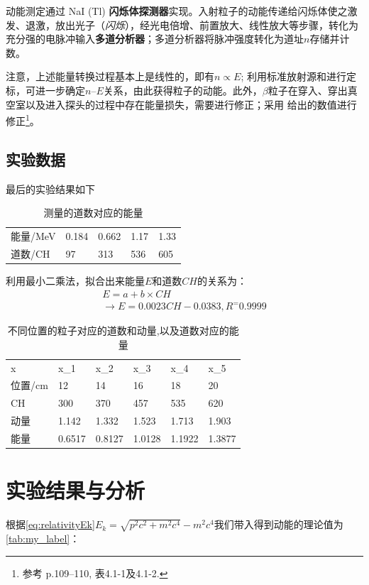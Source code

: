 \documentclass{buaaemp}
\begin{document}
	动能测定通过 NaI (Tl) \textbf{闪烁体探测器}实现。入射粒子的动能传递给闪烁体使之激发、退激，放出光子（\textit{闪烁}），经光电倍增、前置放大、线性放大等步骤，转化为充分强的电脉冲输入\textbf{多道分析器}；多道分析器将脉冲强度转化为道址$n$存储并计数。
	
	注意，上述能量转换过程基本上是线性的，即有$n\propto E$; 利用标准放射源\CsAtom 和\CoAtom 进行定标，可进一步确定$n$--$E$关系，由此获得粒子的动能。此外，$\beta$粒子在穿入、穿出真空室以及进入探头的过程中存在能量损失，需要进行修正；采用 \cite{钱建强2016近代物理实验} 给出的数值进行修正\footnote{%
		参考\cite{钱建强2016近代物理实验} p.\numrange{109}{110}, 表4.1-1及4.1-2. }。


\subsection{实验数据}
最后的实验结果如下

\begin{table}[h]
\begin{tabular}{lllll}
能量/MeV & 0.184 & 0.662 & 1.17 & 1.33 \\ 
道数/CH  & 97    & 313   & 536  & 605          
\end{tabular}
\caption{测量的道数对应的能量}
\label{tab:measure}
\end{table}

利用最小二乘法，拟合出来能量$E$和道数$CH$的关系为：
\begin{equation}
\begin{gathered}
     E=a+b\times CH \\
    \to E=0.0023CH-0.0383, R^=0.9999
\end{gathered}
\end{equation}

\begin{table}[h]
\begin{tabular}{llllll}
x & x\_1 & x\_2 & x\_3 & x\_4 & x\_5 \\ 
位置/cm &12 &14 &16 &18 &20 \\
CH  & 300  & 370  & 457  & 535  & 620 \\
动量 & 1.142 &1.332 &1.523 & 1.713 & 1.903 \\
能量 &0.6517 &0.8127 &1.0128 &1.1922 &1.3877

\end{tabular}
\caption{不同位置的粒子对应的道数和动量,以及道数对应的能量}
\label{tab:beta}
\end{table}

\section{实验结果与分析}
根据\ref{eq:relativityEk}$E_k = \sqrt{p^2 c^2 + m^2 c^4} - m^2 c^4$我们带入得到动能的理论值为\ref{tab:my_label}：
\end{document}
